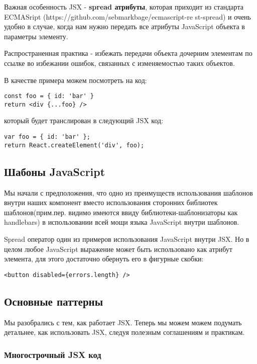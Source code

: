 Важная особенность JSX - \textbf{spread атрибуты}, которая приходит из стандарта ECMASript (https://github.com/sebmarkbage/ecmascript-re st-spread) и очень удобно в случае, когда нам нужно передать все атрибуты JavaScript объекта в параметры элементу.

Распространенная практика - избежать передачи объекта дочерним элементам по ссылке во избежании ошибок, связанных с изменяемостью таких объектов.

В качестве примера можем посмотреть на код:

\begin{lstlisting}
const foo = { id: 'bar' }
return <div {...foo} />
\end{lstlisting}
   
который будет транслирован в следующий JSX код:

\begin{lstlisting}
var foo = { id: 'bar' };
return React.createElement('div', foo);
\end{lstlisting}
   
\subsection{Шабоны JavaScript}

Мы начали с предположения, что одно из преимуществ использования шаблонов внутри наших компонент вместо использования сторонних библиотек шаблонов(прим.пер. видимо имеются ввиду библиотеки-шаблонизаторы как handlebars) в использовании всей мощи языка JavaScript внутри шаблонов.

Spread оператор один из примеров использования JavaScript внутри JSX. Но в целом любое JavaScript выражение может быть использовано как атрибут элемента, для этого достаточно обернуть его в фигурные скобки:

\begin{lstlisting}
<button disabled={errors.length} />
\end{lstlisting}

\subsection{Основные паттерны}

Мы разобрались с тем, как работает JSX. Теперь мы можем можем подумать детальнее, как использовать JSX, следуя полезным соглашениям и практикам.

\subsubsection{Многострочный JSX код}

